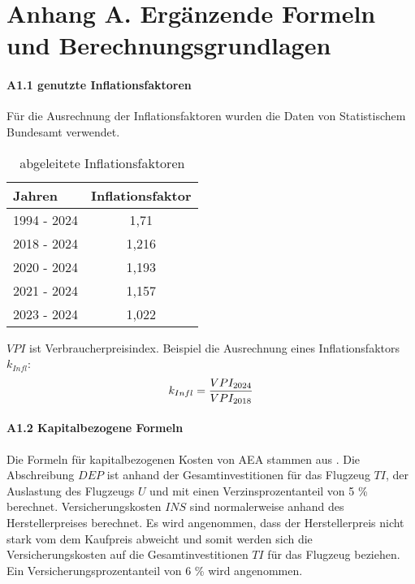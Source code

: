 \chapter{Anhang A. Ergänzende Formeln und Berechnungsgrundlagen}
\subsubsection{A1.1 genutzte Inflationsfaktoren}
Für die Ausrechnung der Inflationsfaktoren wurden die Daten von Statistischem Bundesamt verwendet. 
\begin{table}[h]
	\begin{center}
    \caption{abgeleitete Inflationsfaktoren}
	\label{Inflationsfaktoren}
	\begin{tabular}{|l|c|}
		\hline
		Jahren & \textbf{Inflationsfaktor} \\ \hline
		1994 - 2024 & 1,71 \\ \hline
		2018 - 2024 & 1,216 \\ \hline
		2020 - 2024 & 1,193 \\ \hline
        2021 - 2024 & 1,157 \\ \hline
        2023 - 2024 & 1,022 \\ \hline
	\end{tabular}
    \end{center}
\end{table}

$VPI$ ist Verbraucherpreisindex. Beispiel die Ausrechnung eines Inflationsfaktors $k_{Infl}$:
\begin{equation}
	{k_{Infl}} = \frac{VPI_{2024}}{VPI_{2018}} \\
	\label{inflation}
 \end{equation}

\subsubsection{A1.2 Kapitalbezogene Formeln}
Die Formeln für kapitalbezogenen Kosten von AEA stammen aus \cite{minwoo2019analysis}.
Die Abschreibung $DEP$ ist anhand der Gesamtinvestitionen für das Flugzeug $TI$, der Auslastung des Flugzeugs $U$
und mit einen Verzinsprozentanteil von 5 \% \cite{scholz_design_evaluation_doc} berechnet.
Versicherungskosten $INS$ sind normalerweise anhand des Herstellerpreises berechnet. 
Es wird angenommen, dass der Herstellerpreis nicht stark
vom dem Kaufpreis abweicht und somit werden sich die Versicherungskosten auf die Gesamtinvestitionen $TI$
für das Flugzeug beziehen. Ein Versicherungsprozentanteil von 6 \% wird angenommen.

